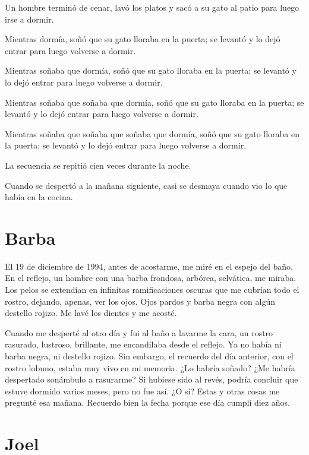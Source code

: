 \documentclass[11pt,twoside,openright]{book}
\begin{document}
Un hombre terminó de cenar, lavó los platos y sacó a su gato al patio para luego irse a dormir.

Mientras dormía, soñó que su gato lloraba en la puerta; se levantó y lo dejó entrar para luego volverse a dormir.

Mientras soñaba que dormía, soñó que su gato lloraba en la puerta; se levantó y lo dejó entrar para luego volverse a dormir.

Mientras soñaba que soñaba que dormía, soñó que su gato lloraba en la puerta; se levantó y lo dejó entrar para luego volverse a dormir.

Mientras soñaba que soñaba que soñaba que dormía, soñó que su gato lloraba en la puerta; se levantó y lo dejó entrar para luego volverse a dormir.

La secuencia se repitió cien veces durante la noche.

Cuando se despertó a la mañana siguiente, casi se desmaya cuando vio lo que había en la cocina.





\chapter*{Barba} 





El 19 de diciembre de 1994, antes de acostarme, me miré en el espejo del baño. En el reflejo, un hombre con una barba frondosa, arbórea, selvática, me miraba. Los pelos se extendían en infinitas ramificaciones oscuras que me cubrían todo el rostro, dejando, apenas, ver los ojos. Ojos pardos y barba negra con algún destello rojizo. Me lavé los dientes y me acosté.

Cuando me desperté al otro día y fui al baño a lavarme la cara, un rostro rasurado, lustroso, brillante, me encandilaba desde el reflejo. Ya no había ni barba negra, ni destello rojizo. Sin embargo, el recuerdo del día anterior, con el rostro lobuno, estaba muy vivo en mi memoria. ¿Lo habría soñado? ¿Me habría despertado sonámbulo a rasurarme? Si hubiese sido al revés, podría concluir que estuve dormido varios meses, pero no fue así. ¿O sí? Estas y otras cosas me pregunté esa mañana. Recuerdo bien la fecha porque ese día cumplí diez años.





\chapter*{Joel} 
\end{document}
